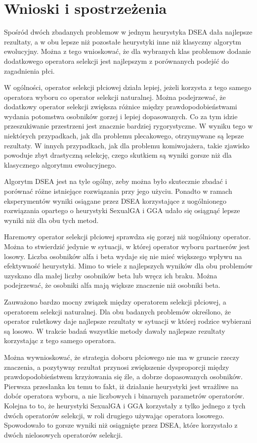 \documentclass[./FM_mgr.tex]{subfiles}
\begin{document}
\chapter{Wnioski i spostrzeżenia}

Spośród dwóch zbadanych problemow w jednym heurystyka DSEA dała najlepsze rezultaty, a w obu lepsze niż pozostałe heurystyki inne niż klasyczny algorytm ewolucyjny.
Można z tego wnioskować, że dla wybranych klas problemow dodanie dodatkowego operatora selekcji jest najlepszym z porównanych podejść do zagadnienia płci.

W ogólności, operator selekcji płciowej działa lepiej, jeżeli korzysta z tego samego operatora wyboru co operator selekcji naturalnej.
Można podejrzewać, że dodatkowy operator selekcji zwiększa różnice między prawdopodobieństwami wydania potomstwa osobników gorzej i lepiej dopasowanych.
Co za tym idzie przeszukiwanie przestrzeni jest znacznie bardziej rygorystyczne.
W wyniku tego w niektórych przypadkach, jak dla problemu plecakowego, otrzymywane są lepsze rezultaty.
W innych przypadkach, jak dla problemu komiwojażera, takie zjawisko powoduje zbyt drastyczną selekcję, czego skutkiem są wyniki gorsze niż dla klasycznego algorytmu ewolucyjnego.

Algorytm DSEA jest na tyle ogólny, zeby można było skutecznie zbadać i porównać różne istniejące rozwiązania przy jego użyciu.
Ponadto w ramach eksperymentów wyniki osiągane przez DSEA korzystające z uogólnionego rozwiązania opartego o heurystyki SexualGA i GGA udało się osiągnąć lepsze wyniki niż dla obu tych metod.

Haremowy operator selekcji płciowej sprawdza się gorzej niż uogólniony operator.
Można to stwierdzić jedynie w sytuacji, w której operator wyboru partnerów jest losowy.
Liczba osobników alfa i beta wydaje się nie mieć większego wpływu na efektywność heurystyki.
Mimo to wiele z najlepszych wyników dla obu problemów uzyskano dla małej liczby osobników beta lub wręcz ich braku.
Można podejrzewać, że osobniki alfa mają większe znaczenie niż osobniki beta.

Zauważono bardzo mocny związek między operatorem selekcji płciowej, a operatorem selekcji naturalnej.
Dla obu badanych problemów określono, że operator ruletkowy daje najlepsze rezultaty w sytuacji w której rodzice wybierani są losowo.
W trakcie badań wszystkie metody dawały najlepsze rezultaty korzystając z tego samego operatora.

Można wywnioskować, że strategia doboru płciowego nie ma w gruncie rzeczy znaczenia, a pozytywny rezultat przynosi zwiększenie dysproporcji między prawdopodobieństwem krzyżowania się źle, a dobrze dopasowanych osobników.
Pierwsza przesłanka ku temu to fakt, iż działanie heurystyki jest wrażliwe na dobór operatora wyboru, a nie liczbowych i binarnych parametrów operatorów.
Kolejna to to, że heurystyki SexualGA i GGA korzystały z tylko jednego z tych dwóch operatorów selekcji, w roli drugiego używając operatora losowego.
Spowodowało to gorsze wyniki niż osiągnięte przez DSEA, które korzystało z dwóch nielosowych operatorów selekcji.
\end{document}
